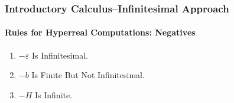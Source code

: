 \begin{frame}
\frametitle{Introductory Calculus--Infinitesimal Approach}
\framesubtitle{Rules for Hyperreal Computations: Negatives}
\label{slide:1.5-16}
\begin{hyperrule}[Negatives]
\begin{enumerate}
\item $-\varepsilon$ Is Infinitesimal.
\item $-b$ Is Finite But Not Infinitesimal.
\item $-H$ Is Infinite.
\end{enumerate}
\end{hyperrule}
\end{frame}
